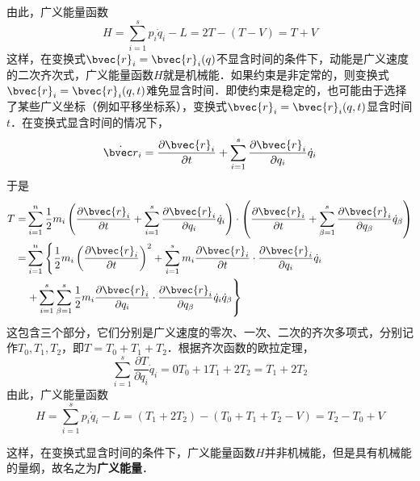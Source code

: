由此，广义能量函数
\begin{equation}
H=\sum_{i=1}^{s} p_{i} \dot{q}_{i}-L=2 T-(T-V)=T+V
\end{equation}
这样，在变换式$\bvec{r}_{i}=\bvec{r}_{i}(q)$不显含时间的条件下，动能是广义速度的二次齐次式，广义能量函数$H $就是机械能．如果约束是非定常的，则变换式$\bvec{r}_{i}=\bvec{r}_{i}(q, t)$难免显含时间．即使约束是稳定的，也可能由于选择了某些广义坐标（例如平移坐标系），变换式$\bvec{r}_{i}=\bvec{r}_{i}(q, t)$显含时间$t $．在变换式显含时间的情况下，
\begin{equation}
\dot{\bvec r}_{i}=\frac{\partial \bvec{r}_{i}}{\partial t}+\sum_{i=1}^{s} \frac{\partial \bvec{r}_{i}}{\partial q_{i}} \dot{q}_{i}
\end{equation}
于是
\begin{equation}
\begin{aligned} T=& \sum_{i=1}^{n} \frac{1}{2} m_{i}\left(\frac{\partial \bvec{r}_{i}}{\partial t}+\sum_{i=1}^{s} \frac{\partial \bvec{r}_{i}}{\partial q_{i}} \dot{q}_{i}\right) \cdot\left(\frac{\partial \bvec{r}_{i}}{\partial t}+\sum_{\beta=1}^{s} \frac{\partial \bvec{r}_{i}}{\partial q_{\beta}} \dot{q}_{\beta}\right) \\=& \sum_{i=1}^{n}\left\{\frac{1}{2} m_{i}\left(\frac{\partial \bvec{r}_{i}}{\partial t}\right)^{2}+\sum_{i=1}^{s} m_{i} \frac{\partial \bvec{r}_{i}}{\partial t} \cdot \frac{\partial \bvec{r}_{i}}{\partial q_{i}} \dot{q}_{i}\right.\\ &\left.+\sum_{i=1}^{s} \sum_{\beta=1}^{s} \frac{1}{2} m_{i} \frac{\partial \bvec{r}_{i}}{\partial q_{i}} \cdot \frac{\partial \bvec{r}_{i}}{\partial q_{\beta}} \dot{q}_{i} \dot{q}_{\beta}\right\} \end{aligned}
\end{equation}
这包含三个部分，它们分别是广义速度的零次、一次、二次的齐次多项式，分别记作$T_0,T_1,T_2$，即$T=T_0+T_1+T_2$．根据齐次函数的欧拉定理，
\begin{equation}
\sum_{i=1}^{s} \frac{\partial T}{\partial \dot{q}_{i}} \dot{q}_{i}=0 T_{0}+1 T_{1}+2 T_{2}=T_{1}+2 T_{2}
\end{equation}
由此，广义能量函数
\begin{equation}
H=\sum_{i=1}^{s} p_{i} \dot{q}_{i}-L=\left(T_{1}+2 T_{2}\right)-\left(T_{0}+T_{1}+T_{2}-V\right)=T_{2}-T_{0}+V
\end{equation}

这样，在变换式显含时间的条件下，广义能量函数$H $并非机械能，但是具有机械能的量纲，故名之为\textbf{广义能量}．

